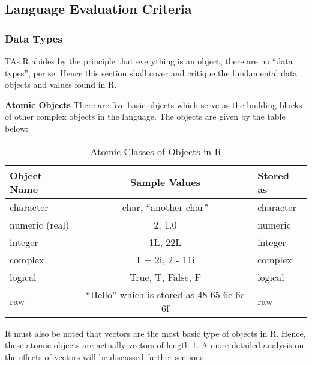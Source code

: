\documentclass[12pt]{article}
\begin{document}
\subsection{Language Evaluation Criteria}

\subsubsection{Data Types}
TAs R abides by the principle that everything is an object, there are no ``data types'', per se. Hence this section shall cover and critique the fundamental data objects and values found in R.

\textbf{Atomic Objects} There are five basic objects which serve as the building blocks of other complex objects in the language. The objects are given by the table below:

\begin{table}[h!]
  \begin{center}
    \caption{Atomic Classes of Objects in R}
    \label{tab:table1}
    \begin{tabular}{|l|c|l|}
      \toprule %
      \textbf{Object Name} & \textbf{Sample Values} & \textbf{Stored as}\\
      \midrule %
      character & char, ``another char'' & character \\
      \hline
      numeric (real) & 2, 1.0 & numeric \\
      \hline
      integer & 1L, 22L & integer \\
      \hline
      complex & 1 + 2i, 2 - 11i & complex \\
      \hline
      logical & True, T, False, F & logical \\
      \hline
      raw & ``Hello'' which is stored as 48 65 6c 6c 6f& raw \\
      \bottomrule
    \end{tabular}
  \end{center}
\end{table}

It must also be noted that vectors are the most basic type of objects in R. Hence, these atomic objects are actually vectors of length 1. A more detailed analysis on the effects of vectors will be discussed further sections.
\end{document}
